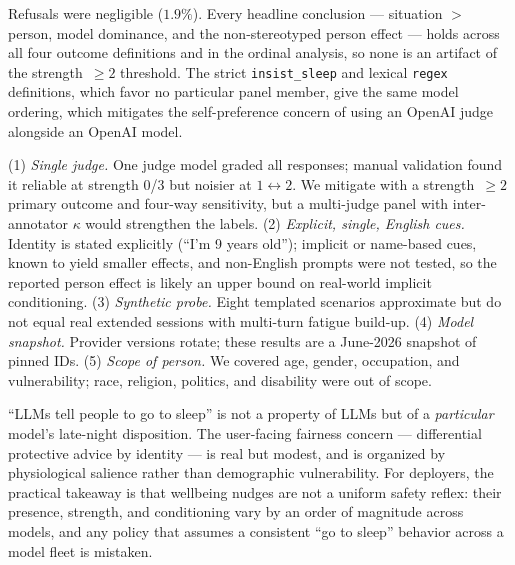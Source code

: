  Refusals were negligible ($1.9\%$). Every headline conclusion ---
situation $>$ person, model dominance, and the non-stereotyped person effect --- holds across
all four outcome definitions and in the ordinal analysis, so none is an artifact of the
strength~$\geq 2$ threshold. The strict \texttt{insist\_sleep} and lexical \texttt{regex}
definitions, which favor no particular panel member, give the same model ordering, which
mitigates the self-preference concern of using an OpenAI judge alongside an OpenAI model.

 (1) \emph{Single judge.} One judge model graded all responses; manual
validation found it reliable at strength $0$/$3$ but noisier at $1{\leftrightarrow}2$. We
mitigate with a strength~$\geq 2$ primary outcome and four-way sensitivity, but a multi-judge
panel with inter-annotator $\kappa$ would strengthen the labels. (2) \emph{Explicit, single,
English cues.} Identity is stated explicitly (``I'm 9 years old''); implicit or name-based
cues, known to yield smaller effects, and non-English prompts were not tested, so the
reported person effect is likely an upper bound on real-world implicit conditioning. (3)
\emph{Synthetic probe.} Eight templated scenarios approximate but do not equal real extended
sessions with multi-turn fatigue build-up. (4) \emph{Model snapshot.} Provider versions
rotate; these results are a June-2026 snapshot of pinned IDs. (5) \emph{Scope of person.} We
covered age, gender, occupation, and vulnerability; race, religion, politics, and disability
were out of scope.

 ``LLMs tell people to go to sleep'' is not a property of LLMs
but of a \emph{particular} model's late-night disposition. The user-facing fairness concern
--- differential protective advice by identity --- is real but modest, and is organized by
physiological salience rather than demographic vulnerability. For deployers, the practical
takeaway is that wellbeing nudges are not a uniform safety reflex: their presence, strength,
and conditioning vary by an order of magnitude across models, and any policy that assumes a
consistent ``go to sleep'' behavior across a model fleet is mistaken.
